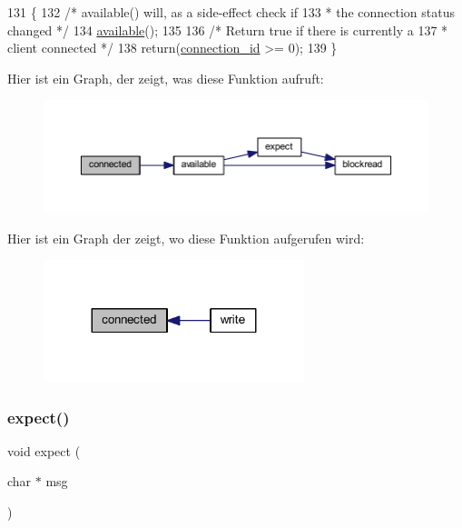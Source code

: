 \begin{DoxyCode}
131 \{
132   \textcolor{comment}{/* available() will, as a side-effect check if}
133 \textcolor{comment}{   * the connection status changed */}
134   \hyperlink{class_esp_server_a4549a76725f2e4c013e4d57018366109}{available}();
135 
136   \textcolor{comment}{/* Return true if there is currently a}
137 \textcolor{comment}{   * client connected */}
138   \textcolor{keywordflow}{return}(\hyperlink{class_esp_server_a821bd4e05f0b260cc584a2d23bda0fff}{connection\_id} >= 0);
139 \}
\end{DoxyCode}
Hier ist ein Graph, der zeigt, was diese Funktion aufruft\+:\nopagebreak
\begin{figure}[H]
\begin{center}
\leavevmode
\includegraphics[width=350pt]{class_esp_server_a59fc494d53391b27e2fd75cb750690d9_cgraph}
\end{center}
\end{figure}
Hier ist ein Graph der zeigt, wo diese Funktion aufgerufen wird\+:\nopagebreak
\begin{figure}[H]
\begin{center}
\leavevmode
\includegraphics[width=215pt]{class_esp_server_a59fc494d53391b27e2fd75cb750690d9_icgraph}
\end{center}
\end{figure}
\mbox{\label{class_esp_server_aff5ea67ab96af075223b2b836036ccf1}} 
\subsubsection{\texorpdfstring{expect()}{expect()}}
{\footnotesize\ttfamily void expect (\begin{DoxyParamCaption}\item[{char $\ast$}]{msg }\end{DoxyParamCaption})\hspace{0.3cm}{\ttfamily [private]}}



